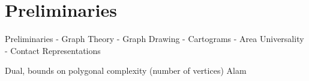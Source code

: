 \chapter{Preliminaries}
\label{chap:preliminaries}

\lipsum


Preliminaries
- Graph Theory
- Graph Drawing
- Cartograms
- Area Universality
- Contact Representations

\cite{kobourov2012putting}


Dual, bounds on polygonal complexity (number of vertices)
Alam \etal{} \cite{alam2013computing}%